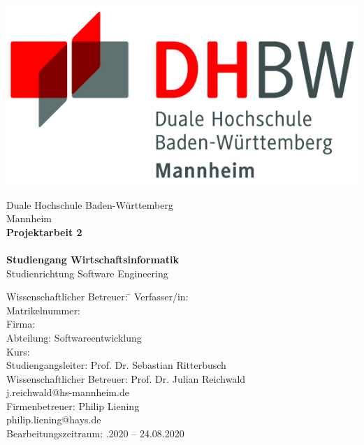 \begin{titlepage}
\begin{minipage}{\textwidth}
		\vspace{-2cm}
		\noindent 
		\hfill   \includegraphics{img/logo.jpg}
\end{minipage}
\vspace{1em}
\sffamily
\begin{center}
	\textsf{\large{}Duale Hochschule Baden-W\"urttemberg\\[1.5mm] Mannheim}\\[2em]
	\textsf{\textbf{\Large{}Projektarbeit 2}}\\[3mm]
	\textsf{\textbf{\DerTitelDerArbeit}} \\[1.5cm]
	\textsf{\textbf{\Large{}Studiengang Wirtschaftsinformatik}\\[3mm] \textsf{Studienrichtung Software Engineering}}
	
	\vspace{3em}
\vfill

\begin{minipage}{\textwidth}

\begin{tabbing}
	Wissenschaftlicher Betreuer: \hspace{0.85cm}\=\kill
	Verfasser/in: \> \DerAutorDerArbeit \\[1.5mm]
	Matrikelnummer:  \\[1.5mm]
	Firma: \> \DerNameDerFirma  \\[1.5mm]
	Abteilung: \> Softwareentwicklung \\[1.5mm]
	Kurs: \> \DieKursbezeichnung \\[1.5mm]
	Studiengangsleiter: \> Prof. Dr. Sebastian Ritterbusch  \\[1.5mm]
	Wissenschaftlicher Betreuer: \> Prof. Dr. Julian Reichwald \\
	\> j.reichwald@hs-mannheim.de \\
	Firmenbetreuer: \> Philip Liening \\
	\> philip.liening@hays.de \\
	Bearbeitungszeitraum: .2020 -- 24.08.2020
\end{tabbing}
\end{minipage}

\end{center}

\end{titlepage}